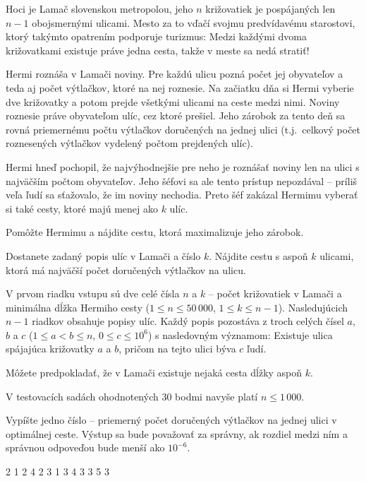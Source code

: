 





Hoci je Lamač slovenskou metropolou, jeho $n$ križovatiek je pospájaných len
$n-1$ obojsmernými ulicami. Mesto za to vďačí svojmu predvídavému starostovi,
ktorý takýmto opatrením podporuje turizmus: Medzi každými dvoma križovatkami
existuje práve jedna cesta, takže v meste sa nedá stratiť!

Hermi roznáša v Lamači noviny. Pre každú ulicu pozná počet jej obyvateľov a teda
aj počet výtlačkov, ktoré na nej roznesie. Na začiatku dňa si Hermi vyberie dve
križovatky a potom prejde všetkými ulicami na ceste medzi nimi. Noviny roznesie
práve obyvateľom ulíc, cez ktoré prešiel. Jeho zárobok za tento deň sa rovná
priemernému počtu výtlačkov doručených na jednej ulici (t.j.\ celkový počet
roznesených výtlačkov vydelený počtom prejdených ulíc).

Hermi hneď pochopil, že najvýhodnejšie pre neho je roznášať noviny len na ulici
s najväčším počtom obyvateľov. Jeho šéfovi sa ale tento prístup nepozdával --
príliš veľa ľudí sa sťažovalo, že im noviny nechodia. Preto šéf zakázal Hermimu
vyberať si také cesty, ktoré majú menej ako $k$ ulíc.

Pomôžte Hermimu a nájdite cestu, ktorá maximalizuje jeho zárobok.



Dostanete zadaný popis ulíc v Lamači a číslo $k$. Nájdite cestu s aspoň $k$
ulicami, ktorá má najväčší počet doručených výtlačkov na ulicu.



V prvom riadku vstupu sú dve celé čísla $n$ a $k$ -- počet križovatiek v Lamači
a minimálna dĺžka Hermiho cesty ($1 \leq n \leq 50\,000$, $1 \leq k \leq n -
1$). Nasledujúcich $n-1$ riadkov obsahuje popisy ulíc. Každý popis pozostáva z
troch celých čísel $a$, $b$ a $c$ ($1 \leq a < b \leq n$, $0 \leq c \leq 10^6$)
s nasledovným významom: Existuje ulica spájajúca križovatky $a$ a $b$, pričom na
tejto ulici býva $c$ ľudí.

Môžete predpokladať, že v Lamači existuje nejaká cesta dĺžky aspoň $k$.

V testovacích sadách ohodnotených $30$ bodmi navyše platí $n \leq 1\,000$.



Vypíšte jedno číslo -- priemerný počet doručených výtlačkov na jednej ulici v
optimálnej ceste. Výstup sa bude považovať za správny, ak rozdiel medzi ním a
správnou odpoveďou bude menší ako $10^{-6}$.



 2
1 2 4
2 3 1
3 4 3
3 5 3
\sampleEND


